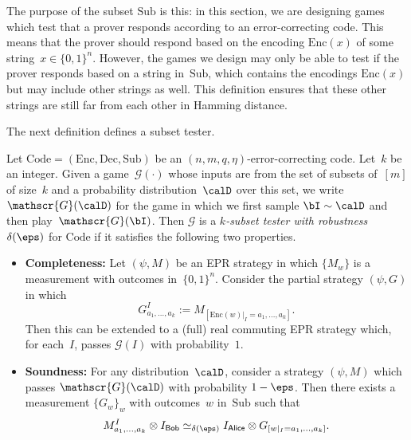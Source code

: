 \documentclass[11pt]{article}
\newcommand{\codec}{\mathrm{Code}}
\newcommand{\codee}{\mathrm{Enc}}
\newcommand{\coded}{\mathrm{Dec}}
\newcommand{\codes}{\mathrm{Sub}}
\newcommand{\consistency}{\simeq}
\newcommand{\game}{\mathscr{G}}
\newcommand{\reg}[1]{{\mathsf{#1}}}
\begin{document}
\begin{remark}
The purpose of the subset $\codes$ is this:
in this section, we are designing games which test that a prover responds according to an error-correcting code.
This means that the prover should respond based on the encoding $\codee(x)$ of some string~$x \in \{0, 1\}^n$.
However, the games we design may only be able to test if the prover responds based on a string in~$\codes$,
which contains the encodings $\codee(x)$ but may include other strings as well.
This definition ensures that these other strings are still far from each other in Hamming distance.
\end{remark}

The next definition defines a subset tester.

\begin{definition}\label{def:testing-a-code}
Let $\codec = (\codee, \coded, \codes)$ be an $(n, m, q, \eta)$-error-correcting code.
Let~$k$ be an integer.
Given a game~$\game(\cdot)$  whose inputs are from the set of subsets of~$[m]$ of size~$k$
and a probability distribution~$\calD$ over this set,
we write $\game(\calD)$ for the game in which we first sample $\bI \sim \calD$ and then play~$\game(\bI)$.
Then $\game$ is a \emph{$k$-subset tester with robustness $\delta(\eps)$} for $\codec$ if it satisfies the following two properties.
\begin{itemize}
\item[$\circ$] \textbf{Completeness:}
Let $(\psi, M)$ be an EPR strategy in which $\{M_w\}$ is a measurement with outcomes in~$\{0, 1\}^n$.
Consider the partial strategy $(\psi, G)$ in which
\begin{equation*}
	G^I_{a_1, \ldots, a_k} := M_{[\codee(w)|_I = a_1, \ldots, a_k]}.
\end{equation*}
Then this can be extended to a (full) real commuting EPR strategy which, for each~$I$, passes $\game(I)$ with probability~$1$.
\item[$\circ$] \textbf{Soundness:} For any distribution~$\calD$, consider a strategy $(\psi, M)$ which passes $\game(\calD)$ with probability $1-\eps$.
Then there exists a measurement $\{G_w\}_{w}$ with outcomes~$w$ in~$\codes$ such that
\begin{equation*}
	M^I_{a_1, \ldots, a_k} \otimes I_{\reg{Bob}} \consistency_{\delta(\eps)} I_{\reg{Alice}} \otimes G_{[w|_I = a_1, \ldots, a_k]}.
\end{equation*}
\end{itemize}
\end{definition}
\end{document}
